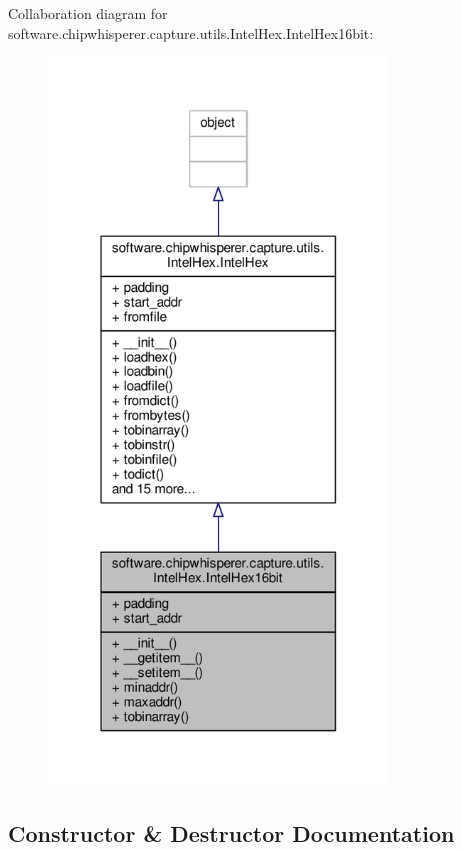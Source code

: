 Collaboration diagram for software.\+chipwhisperer.\+capture.\+utils.\+Intel\+Hex.\+Intel\+Hex16bit\+:\nopagebreak
\begin{figure}[H]
\begin{center}
\leavevmode
\includegraphics[width=256pt]{d4/d14/classsoftware_1_1chipwhisperer_1_1capture_1_1utils_1_1IntelHex_1_1IntelHex16bit__coll__graph}
\end{center}
\end{figure}


\subsection{Constructor \& Destructor Documentation}
\hypertarget{classsoftware_1_1chipwhisperer_1_1capture_1_1utils_1_1IntelHex_1_1IntelHex16bit_a9fcb7ef259b84001f1472e5c1f8c3320}{}
